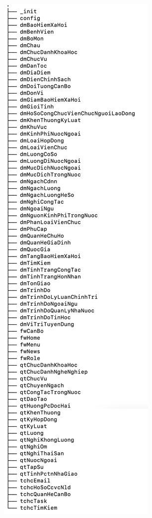 \begin{figure}[H]
    \centering
    \begin{subfigure}[b]{0.4\linewidth}
        \includegraphics[width=\linewidth]{img/module.png}

\end{subfigure}
\end{figure}
